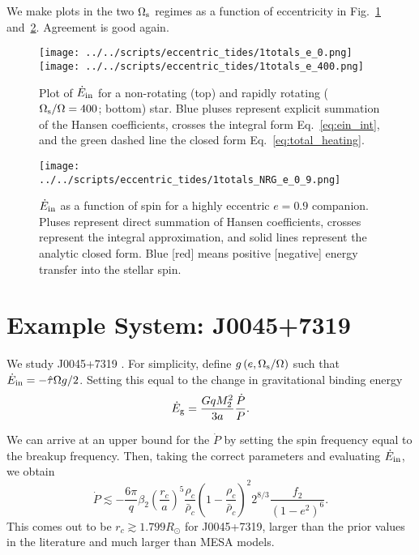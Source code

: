 \documentclass[
        fleqn,
        usenatbib,
    ]{mnras}
\newcommand*{\p}[1]{\left(#1\right)}
\begin{document}
We make plots in the two $\Omega_{\rm s}$ regimes as a function of eccentricity in
Fig.~\ref{fig:e0} and~\ref{fig:e_spin}. Agreement is good again.
\begin{figure}
    \centering
    \texttt{[image: ../../scripts/eccentric\_tides/1totals\_e\_0.png]}
    \texttt{[image: ../../scripts/eccentric\_tides/1totals\_e\_400.png]}
    \caption{Plot of $\dot{E}_{\rm in}$ for a non-rotating (top) and rapidly
    rotating ($\Omega_{\rm s} / \Omega = 400$; bottom) star. Blue pluses
    represent explicit summation of the Hansen coefficients, crosses the
    integral form Eq.~\eqref{eq:ein_int}, and the green dashed line the closed
    form Eq.~\eqref{eq:total_heating}.}\label{fig:e0}
\end{figure}
\begin{figure}
    \centering
    \texttt{[image: ../../scripts/eccentric\_tides/1totals\_NRG\_e\_0\_9.png]}
    \caption{$\dot{E}_{\rm in}$ as a function of spin for a highly eccentric $e
    = 0.9$ companion. Pluses represent direct summation of Hansen coefficients,
    crosses represent the integral approximation, and solid lines represent
    the analytic closed form. Blue [red] means positive [negative]
    energy transfer into the stellar spin.}\label{fig:e_spin}
\end{figure}

\section{Example System: J0045+7319}\label{s:j00457319}

We study J0045+7319 \citep{bell1995psr}. For simplicity, define $g\p{e,
\Omega_{\rm s} / \Omega}$ such that $\dot{E}_{\rm in} = -\hat{\tau}\Omega g /
2$. Setting this equal to the change in gravitational binding energy
\begin{equation}
    \dot{E}_{\rm g} = \frac{GqM_2^2}{3a}\frac{\dot{P}}{P}.
\end{equation}

We can arrive at an upper bound for the $\dot{P}$ by setting the spin frequency
equal to the breakup frequency. Then, taking the correct parameters and
evaluating $\dot{E}_{\rm in}$, we obtain
\begin{equation}
    \dot{P} \lesssim
        -\frac{6\pi}{q}\beta_2 \left(\frac{r_c}{a}\right)^5
        \frac{\rho_c}{\bar{\rho}_c} \left(1 -
        \frac{\rho_c}{\bar{\rho}_c}\right)^2 2^{8/3}\frac{f_2}{(1 - e^2)^6}.
\end{equation}
This comes out to be $r_c \gtrsim 1.799R_{\odot}$ for J0045+7319, larger than
the prior values in the literature and much larger than MESA models.
\end{document}
